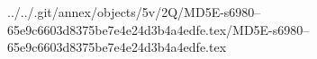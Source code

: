 ../../.git/annex/objects/5v/2Q/MD5E-s6980--65e9c6603d8375be7e4e24d3b4a4edfe.tex/MD5E-s6980--65e9c6603d8375be7e4e24d3b4a4edfe.tex